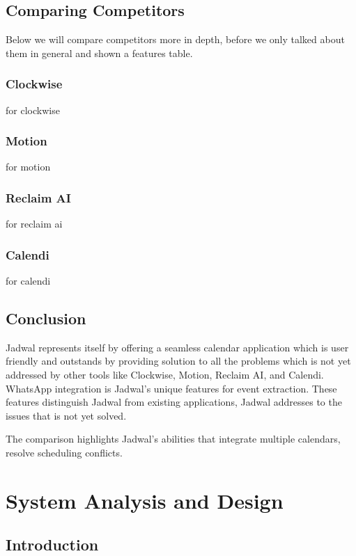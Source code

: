 \documentclass[12pt,a4paper]{report}
\begin{document}
\section{Comparing Competitors}

Below we will compare competitors more in depth, before we only talked about them in general and shown a features table.

\subsection{Clockwise}

for clockwise

\subsection{Motion}

for motion

\subsection{Reclaim AI}

for reclaim ai

\subsection{Calendi}

for calendi

\section{Conclusion}

Jadwal represents itself by offering a seamless calendar application which is user friendly and outstands by providing solution to all the problems which is not yet addressed by other tools like Clockwise, Motion, Reclaim AI, and Calendi. WhatsApp integration is Jadwal’s unique features for event extraction. These features distinguish Jadwal from existing applications, Jadwal addresses to the issues that is not yet solved.

The comparison highlights Jadwal's abilities that integrate multiple calendars, resolve scheduling conflicts. 

\chapter{System Analysis and Design}

\section{Introduction}
\end{document}
